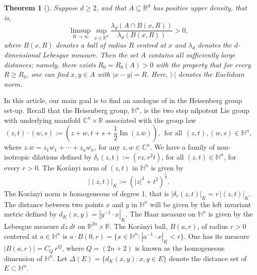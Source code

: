 \documentclass[11pt, reqno]{amsart}
\theoremstyle{plain}
\newtheorem{untheorem}{Theorem}
\newcommand{\R}{\ensuremath{\mathbb{R_+}}}
\theoremstyle{remark}
\theoremstyle{example}
\theoremstyle{definition}
\numberwithin{equation}{section}
\def\R{\mathbb{R}}
\def\H{\mathbb{H}}
\def\Ha{\mathbb{H}^n}
\newcommand{\Ca}{\mathbb{C}^n}
\newcommand{\im}{\mathop{\mathrm{Im}}}
\begin{document}
\begin{untheorem}[\cite{{1986Bourgain}, {Falconer-Marstrand-1986},{FKW-1990}}] \label{all-large-dist-thm}
Suppose $d \geq 2$, and that $A \subseteq \mathbb R^d$ has positive upper density, that is,
\begin{equation} \label{Bourgain-liminf-condition} 
\limsup_{R \rightarrow \infty} \sup_{x \in \R^d} \frac{\lambda_d(A \cap B(x,R))}{\lambda_d(B(x,R))} > 0,
\end{equation} 
where $B(x,R)$ denotes a ball of radius $R$ centred at $x$ and $\lambda_d$ denotes the $d$-dimensional Lebesgue measure. Then the set $A$ contains all sufficiently large distances; namely, there exists $R_0 = R_0(A) > 0$ with the property that for every $R \geq R_0$, one can find $x, y \in A$ with $|x-y| = R$. Here, $|\cdot|$ denotes the Euclidean norm. 
\end{untheorem}


In this article, our main goal is to find an anologue of  in the Heisenberg group set-up. Recall that the Heisenberg group, $\mathbb{H}^n$, is the two step nilpotent Lie group with underlying manifold $\mathbb{C}^n \times \mathbb{R}$ associated with the group law
\begin{equation}
(z,t) \cdot (w,s) := \left(  z + w, t + s + {\textstyle \frac{1}{2} }  \im(  z . \overline{w}) \right),\ \ \text{for all} \ \ (z,t), (w,s) \in \mathbb{H}^n,
\end{equation} 
where $z. \overline{w}= z_{1} \overline{w_{1}}+ \cdots + z_{n} \overline{w_{n}}$, for any $z,w \in \Ca$. We have a family of non-isotropic dilations defined by $\delta_{r}(z,t):=(rz,r^2t)$, for all $(z,t) \in \mathbb{H}^n$, for every $r>0$. The Kor\'anyi norm of $(z,t)$ in $\mathbb H^n$ is given by 
\begin{equation}
    |(z,t)|_K:=\left(|z|^4 + t^2\right)^{\frac14}.  \label{eq: Koranyi}
\end{equation} 
The Kor\'anyi norm is homogeneous of degree 1, that is $|\delta_{r}(z,t)|_K= r \,  |(z,t)|_K$.  The distance between two points $x$ and $y$ in $\mathbb H^n$  will be given by the left invariant metric defined by $d_K(x,y)=| y^{-1} \cdot x|_K$. 
The Haar measure on $\mathbb H^n$ is given by the Lebesgue measure $dz\ dt$ on $\mathbb R^{2n}\times \mathbb R$. The Kor\'anyi ball, $B(a,r)$, of radius $r>0$ centered at $a \in \Ha$ is $ a \cdot B(0,r) = \{x \in \mathbb H^n:|a^{-1} \cdot x|_K<r\} $. One has its measure $|B(a,r)| = C_{Q} \, r^{Q}$, where $Q=(2n + 2)$ is known as the homogeneous dimension of $\H^n$. Let $\Delta(E)=\{d_K(x,y):x,y\in E\}$ denote the distance set of $E\subset \mathbb H^n$. 
\end{document}
